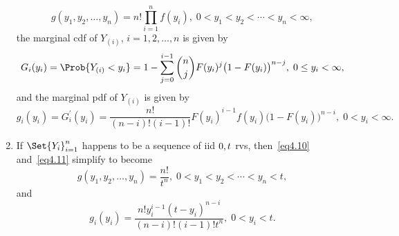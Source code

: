 \begin{Regular}
\begin{enumerate}[(1)]
              \[ g(y_{1}, y_{2}, \ldots, y_{n})=n ! \prod_{i=1}^{n} f(y_{i}),\; 0<y_{1}<y_{2}<\cdots<y_{n}<\infty,\label{eq4.10}\tag*{(4.10)} \]
              the marginal cdf of $ Y_{(i)} $, $ i=1,2,\ldots,n $ is given by
              \[ G_i(y_i)=\Prob{Y_{(i)}<y_i}
                  =1-\sum_{j=0}^{i-1}\binom{n}{j} F(y_i)^j\bigl(1-F(y_i)\bigr)^{n-j},\; 0\le y_i<\infty, \]
              and the marginal pdf of $ Y_{(i)} $ is given by
              \[ g_i(y_i)=G_i^\prime(y_i)=\frac{n!}{(n-i)!(i-1)!}
                  F(y_i)^{i-1}f(y_i)\bigl(1-F(y_i)\bigr)^{n-i},\; 0< y_i<\infty.\label{eq4.11}\tag*{(4.11)} \]
        \item If $ \Set{Y_i}_{i=1}^n $ happens to be a sequence of iid $ \relax{0,t} $ rvs, then~\ref{eq4.10}
              and~\ref{eq4.11} simplify to become
              \[ g(y_1,y_2,\ldots,y_n)=\frac{n!}{t^n},\;0<y_1<y_2<\cdots<y_n<t,\label{eq4.12}\tag*{(4.12)} \]
              and
              \[ g_i(y_i)=\frac{n!y_i^{i-1}(t-y_i)^{n-i}}{(n-i)!(i-1)!t^n},\; 0<y_i<t. \]
    \end{enumerate}
\end{Regular}
